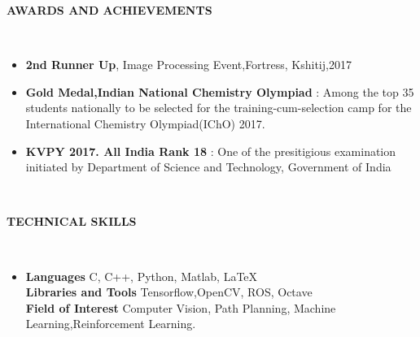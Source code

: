 \documentclass[a4paper,10pt]{article}
\newcommand{\lsep}{-0.5cm}
\newcommand{\resheading}[1]{{\small \colorbox{mygrey}{\begin{minipage}{0.975\textwidth}{\textbf{#1 \vphantom{p\^{E}}}}\end{minipage}}}}
\begin{document}
\resheading{\textbf{AWARDS AND ACHIEVEMENTS} }\\[\lsep]
\begin{itemize}

\item \noindent \textbf{2nd Runner Up}, Image Processing Event,Fortress, Kshitij,2017 
\item \noindent \textbf{Gold Medal,Indian National Chemistry Olympiad} : Among the top 35 students nationally to be selected for the training-cum-selection camp for the International Chemistry Olympiad(IChO) 2017.
\item \noindent \textbf{KVPY 2017. All India Rank 18} :
One of the presitigious examination initiated by Department of Science and Technology, Government of India
\end{itemize}

\hspace{0.5cm}\\[-0.2cm]
\resheading{\textbf{TECHNICAL SKILLS} }\\[\lsep]
\begin{itemize}
\item \noindent \textbf{Languages} C, C++, Python, Matlab, {\LaTeX{}} \\
\textbf{Libraries and Tools} Tensorflow,OpenCV, ROS, Octave \\
\textbf{Field of Interest} Computer Vision, Path Planning, Machine Learning,Reinforcement Learning. \\
\end{itemize}
\end{document}
